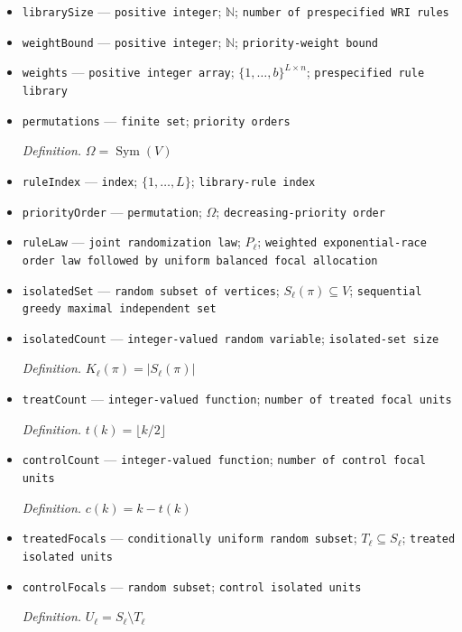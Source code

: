 \documentclass{article}
\begin{document}
\begin{itemize}
  \item \texttt{librarySize} --- \texttt{positive integer}; \(\mathbb N\); \texttt{number of prespecified WRI rules}
  \item \texttt{weightBound} --- \texttt{positive integer}; \(\mathbb N\); \texttt{priority-\allowbreak{}weight bound}
  \item \texttt{weights} --- \texttt{positive integer array}; \(\{1,\ldots,b\}^{L\times n}\); \texttt{prespecified rule library}
  \item \texttt{permutations} --- \texttt{finite set}; \texttt{priority orders}
  \par\smallskip\noindent\emph{Definition.} \(\Omega=\operatorname{Sym}(V)\)
  \item \texttt{ruleIndex} --- \texttt{index}; \(\{1,\ldots,L\}\); \texttt{library-\allowbreak{}rule index}
  \item \texttt{priorityOrder} --- \texttt{permutation}; \(\Omega\); \texttt{decreasing-\allowbreak{}priority order}
  \item \texttt{ruleLaw} --- \texttt{joint randomization law}; \(P_{\ell}\); \texttt{weighted exponential-\allowbreak{}race order law followed by uniform balanced focal allocation}
  \item \texttt{isolatedSet} --- \texttt{random subset of vertices}; \(S_{\ell}(\pi)\subseteq V\); \texttt{sequential greedy maximal independent set}
  \item \texttt{isolatedCount} --- \texttt{integer-\allowbreak{}valued random variable}; \texttt{isolated-\allowbreak{}set size}
  \par\smallskip\noindent\emph{Definition.} \(K_{\ell}(\pi)=|S_{\ell}(\pi)|\)
  \item \texttt{treatCount} --- \texttt{integer-\allowbreak{}valued function}; \texttt{number of treated focal units}
  \par\smallskip\noindent\emph{Definition.} \(t(k)=\lfloor k/2\rfloor\)
  \item \texttt{controlCount} --- \texttt{integer-\allowbreak{}valued function}; \texttt{number of control focal units}
  \par\smallskip\noindent\emph{Definition.} \(c(k)=k-t(k)\)
  \item \texttt{treatedFocals} --- \texttt{conditionally uniform random subset}; \(T_{\ell}\subseteq S_{\ell}\); \texttt{treated isolated units}
  \item \texttt{controlFocals} --- \texttt{random subset}; \texttt{control isolated units}
  \par\smallskip\noindent\emph{Definition.} \(U_{\ell}=S_{\ell}\setminus T_{\ell}\)

\end{itemize}
\end{document}
